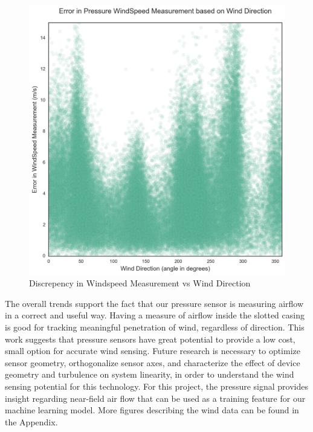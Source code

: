 \begin{figure}[htb]
 	\includegraphics[width=\textwidth]{figs/ws_error_vs_wd}               
 	 \caption{Discrepency in Windspeed Measurement vs Wind Direction}
  	\label{fig:ws_error_vs_wd}
\end{figure}

The overall trends support the fact that our pressure sensor is measuring airflow in a correct and useful way.  Having a measure of airflow inside the slotted casing is good for tracking meaningful penetration of wind, regardless of direction.  This work suggests that pressure sensors have great potential to provide a low cost, small option for accurate wind sensing.  Future research is necessary to optimize sensor geometry, orthogonalize sensor axes, and characterize the effect of device geometry and turbulence on system linearity, in order to understand the wind sensing potential for this technology.  For this project, the pressure signal provides insight regarding near-field air flow that can be used as a training feature for our machine learning model.  More figures describing the wind data can be found in the Appendix.
